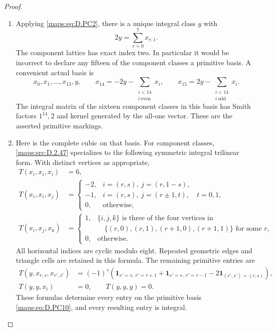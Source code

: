 \begin{proof}
\begin{enumerate}[label=\arabic*.,leftmargin=*]
\item Applying \eqref{maps:eq:D.PC2}, there is a unique integral class $y$ with
\[
                    2y=\sum_{r=0}^{7}x_{r,1}.             \tag{D.PC9}\label{maps:eq:D.PC9}
\]
The component lattice has exact index two. In particular it would
be incorrect to declare any fifteen of the component classes a
primitive basis. A convenient actual basis is
\[
 x_0,x_1,\ldots,x_{13},y,\qquad
 x_{14}=-2y-\sum_{\substack{i<14\\i\ \mathrm{even}}}x_i,
 \qquad
 x_{15}=2y-\sum_{\substack{i<14\\i\ \mathrm{odd}}}x_i.
                                                               \tag{D.PC10}\label{maps:eq:D.PC10}
\]
The integral matrix of the sixteen component classes in this basis
has Smith factors $1^{14},2$ and kernel generated by the all-one
vector. These are the asserted primitive markings.

\item Here is the complete cubic on that basis. For component classes,
\ref{maps:src:D.2.47} specializes to the following symmetric integral trilinear
form. With distinct vertices as appropriate,
\[
 \begin{aligned}
 T(x_i,x_i,x_i)&=6,\\
 T(x_i,x_i,x_j)&=
 \begin{cases}
 -2,&i=(r,s),\ j=(r,1-s),\\
 -1,&i=(r,s),\ j=(r\pm1,t),\quad t=0,1,\\
 0,&\text{otherwise},
 \end{cases}\\
 T(x_i,x_j,x_k)&=
 \begin{cases}
 1,&\{i,j,k\}\text{ is three of the four vertices in}\\[-2pt]
   &\hspace{12pt}\{(r,0),(r,1),(r+1,0),(r+1,1)\}
                   \text{ for some }r,\\
 0,&\text{otherwise}.
 \end{cases}
 \end{aligned}                                             \tag{D.PC11}\label{maps:eq:D.PC11}
\]
All horizontal indices are cyclic modulo eight. Repeated geometric
edges and triangle cells are retained in this formula.
The remaining primitive entries are
\[
 \begin{aligned}
 T(y,x_{r,s},x_{r',s'})
 &=(-1)^s\left(
       \mathbf1_{s'=s,\ r'=r+1}
      +\mathbf1_{s'=s,\ r'=r-1}
      -2\mathbf1_{(r',s')=(r,s)}\right),\\
 T(y,y,x_i)&=0,\qquad T(y,y,y)=0.
 \end{aligned}                                             \tag{D.PC12}\label{maps:eq:D.PC12}
\]
These formulas determine every entry on the primitive basis
\eqref{maps:eq:D.PC10}, and every resulting entry is integral.


\end{enumerate}
\end{proof}
